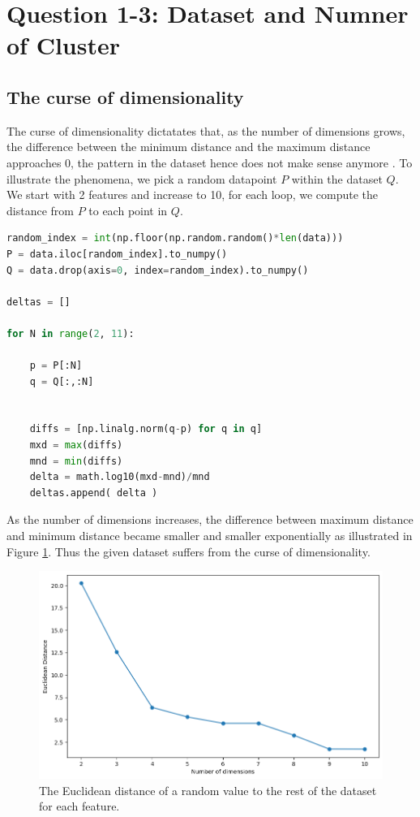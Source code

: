 \section{Question 1-3: Dataset and Numner of Cluster} \label{Sec: Question 1}

\subsection{The curse of dimensionality}
The curse of dimensionality dictatates that, as the number of dimensions grows, the difference between the minimum distance and the maximum distance approaches 0, the pattern in the dataset hence does not make sense anymore \cite{koppen2000curse}.
To illustrate the phenomena, we pick a random datapoint $P$ within the dataset $Q$.
We start with 2 features and increase to 10, for each loop, we compute the distance from $P$ to each point in $Q$.

\begin{lstlisting}[language=Python]
random_index = int(np.floor(np.random.random()*len(data)))
P = data.iloc[random_index].to_numpy()
Q = data.drop(axis=0, index=random_index).to_numpy()

deltas = []

for N in range(2, 11):

    p = P[:N]
    q = Q[:,:N]


    diffs = [np.linalg.norm(q-p) for q in q]
    mxd = max(diffs)
    mnd = min(diffs)
    delta = math.log10(mxd-mnd)/mnd
    deltas.append( delta )
\end{lstlisting}

As the number of dimensions increases, the difference between maximum distance and minimum distance became smaller and smaller exponentially as illustrated in Figure \ref{Fig: curse of dim}.
Thus the given dataset suffers from the curse of dimensionality.

\begin{figure}
    \includegraphics[width=\textwidth]{Appendices/curse-dim.png}
    \caption{The Euclidean distance of a random value to the rest of the dataset for each feature.}
    \label{Fig: curse of dim}
\end{figure}

